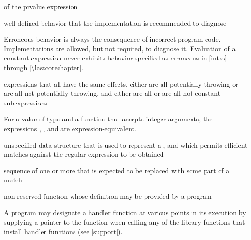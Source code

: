 %
  of the prvalue expression

%
well-defined behavior that the implementation is recommended to diagnose
\begin{defnote}
Erroneous behavior is always the consequence of incorrect program code.
Implementations are allowed, but not required,
to diagnose it.
Evaluation of a constant expression
never exhibits behavior specified as erroneous in \ref{intro} through \ref{\lastcorechapter}.
\end{defnote}

%
expressions that all have the same effects,
either
are all potentially-throwing or
are all not potentially-throwing,
and
either
are all  or
are all not constant subexpressions

\begin{example}
For a value  of type 
and a function  that accepts integer arguments,
the expressions
,
,
and
are expression-equivalent.
\end{example}

%
unspecified data structure that is used to
represent a , and which permits efficient matches
against the regular expression to be obtained

%
sequence of one or more  that is expected to be
replaced with some part of a  match

%
non-reserved function whose definition may be provided by a \Cpp{} program

\begin{defnote}
A \Cpp{} program may designate a handler function at various points in its execution by
supplying a pointer to the function when calling any of the library functions that install
handler functions (see \ref{support}).
\end{defnote}

